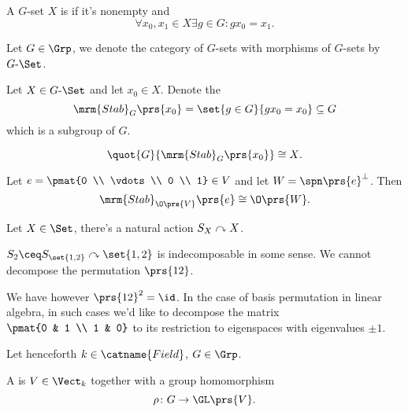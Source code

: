 \documentclass[10pt,a4paper,twoside,openany,hidelinks]{book}
\begin{document}
\begin{definition}
A $G$-set $X$ is  if it's nonempty and
\[\forall x_0, x_1 \in X \exists g \in G \colon g x_0 = x_1 \text{.}\]
\end{definition}

\begin{notation}
Let $G \in \Grp$, we denote the category of $G$-sets with morphisms of $G$-sets by $G\text{-}\Set$.
\end{notation}

\begin{definition}
Let $X \in G\text{-}\Set$ and let $x_0 \in X$.
Denote the 
\[\mrm{Stab}_G\prs{x_0} = \set{g \in G}{g x_0 = x_0} \subseteq G\]
which is a subgroup of $G$.
\end{definition}

\begin{remark}
\[\quot{G}{\mrm{Stab}_G\prs{x_0}} \cong X \text{.}\]
\end{remark}

\begin{example}
Let $e = \pmat{0 \\ \vdots \\ 0 \\ 1} \in V$ and let $W = \spn\prs{e}^\perp$.
Then
\[\mrm{Stab}_{\O\prs{V}} \prs{e} \cong \O\prs{W} \text{.}\]
\end{example}

\begin{example}
Let $X \in \Set$, there's a natural action $S_X \curvearrowright X$.
\end{example}

\begin{example}
$S_2 \ceq S_{\set{1,2}} \acts \set{1,2}$ is indecomposable in some sense. We cannot decompose the permutation $\prs{1 2}$.

We have however $\prs{1 2}^2 = \id$.
In the case of basis permutation in linear algebra, in such cases we'd like to decompose the matrix $\pmat{0 & 1 \\ 1 & 0}$ to its restriction to eigenspaces with eigenvalues $\pm 1$.
\end{example}

\begin{notation}
Let henceforth $k \in \catname{Field}$, $G \in \Grp$.
\end{notation}

\begin{definition}
A  is $V \in \Vect_k$ together with a group homomorphism
\[\rho \colon G \to \GL\prs{V} \text{.}\]
\end{definition}
\end{document}
